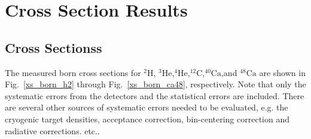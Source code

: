 \chapter{Cross Section Results}


\section{Cross Sectionss}
The measured born cross sections for $\mathrm{^{2}H}$, $\mathrm{^{3}He}$,$\mathrm{^{4}He}$,$\mathrm{^{12}C}$,$\mathrm{^{40}Ca}$,and $\mathrm{^{48}Ca}$ are shown in Fig.~\ref{xs_born_h2} through Fig.~\ref{xs_born_ca48}, respectively. Note that only the systematic errors from the detectors and the statistical errors are included. There are several other sources of systematic errors needed to be evaluated, e.g. the cryogenic target densities, acceptance correction, bin-centering correction and radiative corrections. etc..

